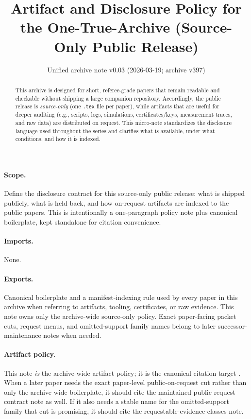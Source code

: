 \documentclass[11pt]{article}
\title{Artifact and Disclosure Policy for the One-True-Archive (Source-Only Public Release)}
\author{}
\date{Unified archive note v0.03 (2026-03-19; archive v397)}
\begin{document}
\maketitle

\begin{abstract}
This archive is designed for short, referee-grade papers that remain readable and checkable without shipping a large companion repository.
Accordingly, the public release is \emph{source-only} (one \texttt{.tex} file per paper), while artifacts that are useful for deeper auditing
(e.g., scripts, logs, simulations, certificates/keys, measurement traces, and raw data) are distributed on request.
This micro-note standardizes the disclosure language used throughout the series and clarifies what is available, under what conditions, and how it is indexed.
\end{abstract}

\paragraph{Scope.}
Define the disclosure contract for this source-only public release: what is shipped publicly, what is held back, and how on-request artifacts are indexed to the public papers. This is intentionally a one-paragraph policy note plus canonical boilerplate, kept standalone for citation convenience.

\paragraph{Imports.}
None.

\paragraph{Exports.}
Canonical boilerplate and a manifest-indexing rule used by every paper in this archive when referring to artifacts, tooling, certificates, or raw evidence. This note owns only the archive-wide source-only policy. Exact paper-facing packet cuts, request menus, and omitted-support family names belong to later successor-maintenance notes when needed.

\paragraph{Artifact policy.}
This note \emph{is} the archive-wide artifact policy; it is the canonical citation target \cite{series:artifactpolicy}. When a later paper needs the exact paper-level public-on-request cut rather than only the archive-wide boilerplate, it should cite the maintained public-request-contract note as well. If it also needs a stable name for the omitted-support family that cut is promising, it should cite the requestable-evidence-classes note.\cite{series:publicrequestcontracts,series:requestableevidenceclasses}
\end{document}
